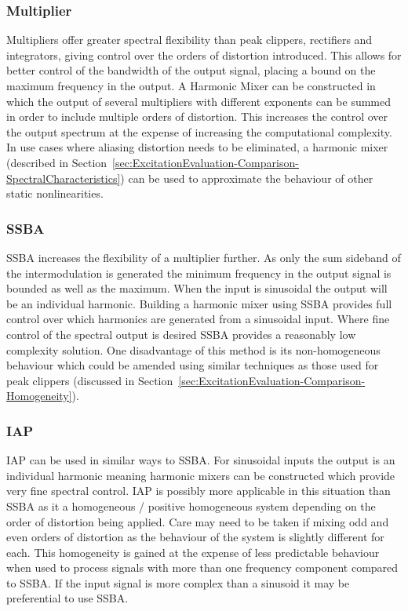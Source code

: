 		\subsubsection*{Multiplier}
			Multipliers offer greater spectral flexibility than peak clippers, rectifiers and integrators,
			giving control over the orders of distortion introduced. This allows for better control of the
			bandwidth of the output signal, placing a bound on the maximum frequency in the output. A Harmonic
			Mixer can be constructed in which the output of several multipliers with different exponents can be
			summed in order to include multiple orders of distortion. This increases the control over the
			output spectrum at the expense of increasing the computational complexity. In use cases where
			aliasing distortion needs to be eliminated, a harmonic mixer (described in
			Section~\ref{sec:ExcitationEvaluation-Comparison-SpectralCharacteristics}) can be used to
			approximate the behaviour of other static nonlinearities.

		\subsubsection*{SSBA}
			SSBA increases the flexibility of a multiplier further. As only the sum sideband of the
			intermodulation is generated the minimum frequency in the output signal is bounded as well as the
			maximum. When the input is sinusoidal the output will be an individual harmonic. Building a
			harmonic mixer using SSBA provides full control over which harmonics are generated from a
			sinusoidal input. Where fine control of the spectral output is desired SSBA provides a reasonably
			low complexity solution. One disadvantage of this method is its non-homogeneous behaviour which
			could be amended using similar techniques as those used for peak clippers (discussed in
			Section~\ref{sec:ExcitationEvaluation-Comparison-Homogeneity}).

		\subsubsection*{IAP}
			IAP can be used in similar ways to SSBA. For sinusoidal inputs the output is an individual harmonic
			meaning harmonic mixers can be constructed which provide very fine spectral control. IAP is
			possibly more applicable in this situation than SSBA as it a homogeneous / positive homogeneous
			system depending on the order of distortion being applied. Care may need to be taken if mixing odd
			and even orders of distortion as the behaviour of the system is slightly different for each. This
			homogeneity is gained at the expense of less predictable behaviour when used to process signals
			with more than one frequency component compared to SSBA. If the input signal is more complex than a
			sinusoid it may be preferential to use SSBA.

